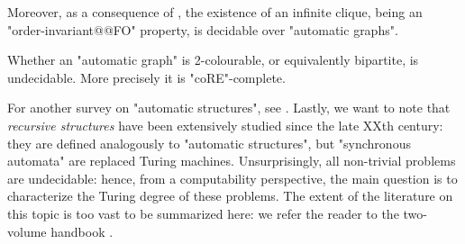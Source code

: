 Moreover, as a consequence of , the existence of an infinite clique,
being an "order-invariant@@FO" property, is decidable over "automatic graphs".

\begin{proposition}
	Whether an "automatic graph" is 2-colourable, or equivalently bipartite, is undecidable.
	More precisely it is "coRE"-complete.
\end{proposition}

For another survey on "automatic structures", see \cite{Gradel2020AutomaticStructures}.
Lastly, we want to note that \emph{recursive structures} have been extensively studied
since the late XXth century: they are defined analogously to "automatic structures",
but "synchronous automata" are replaced Turing machines.
Unsurprisingly, all non-trivial problems are undecidable: hence, from a computability perspective,
the main question is to characterize the Turing degree of these problems.
The extent of the literature on this topic is too vast to be summarized here:
we refer the reader to the two-volume handbook \cite{ErshovGoncharovNerodeRemmelMarek1998Handbook1,ErshovGoncharovNerodeRemmelMarek1998Handbook2}.

